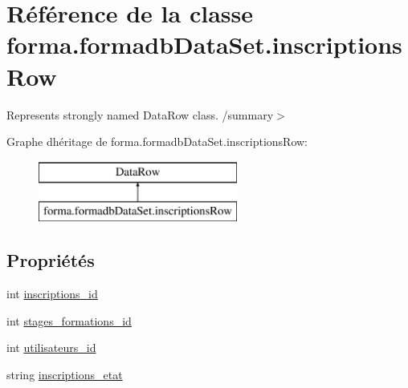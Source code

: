 \hypertarget{classforma_1_1formadb_data_set_1_1inscriptions_row}{}\section{Référence de la classe forma.\+formadb\+Data\+Set.\+inscriptions\+Row}
\label{classforma_1_1formadb_data_set_1_1inscriptions_row}


Represents strongly named Data\+Row class. /summary$>$  


Graphe d\textquotesingle{}héritage de forma.\+formadb\+Data\+Set.\+inscriptions\+Row\+:\begin{figure}[H]
\begin{center}
\leavevmode
\includegraphics[height=2.000000cm]{classforma_1_1formadb_data_set_1_1inscriptions_row}
\end{center}
\end{figure}
\subsection*{Propriétés}
\begin{DoxyCompactItemize}
\item 
int \hyperlink{classforma_1_1formadb_data_set_1_1inscriptions_row_a6b085aa2f4bb813d337da54bccdb5d55}{inscriptions\+\_\+id}
\item 
int \hyperlink{classforma_1_1formadb_data_set_1_1inscriptions_row_a56afb06280aa2b54cae82badfe498705}{stages\+\_\+formations\+\_\+id}
\item 
int \hyperlink{classforma_1_1formadb_data_set_1_1inscriptions_row_a423fe4af1405653f9c59da6f92e4afcc}{utilisateurs\+\_\+id}
\item 
string \hyperlink{classforma_1_1formadb_data_set_1_1inscriptions_row_ae23b53c84666df8c095238bca6c667f1}{inscriptions\+\_\+etat}
\end{DoxyCompactItemize}


